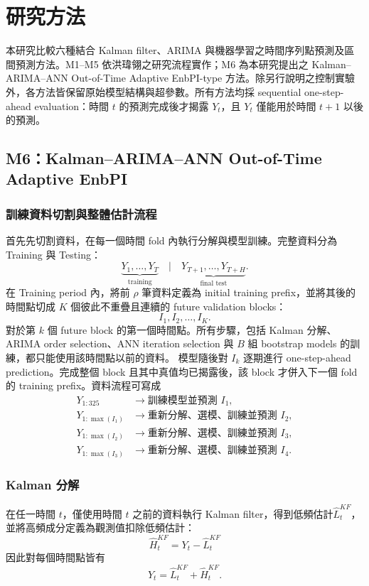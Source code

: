 \section{研究方法}
\label{sec:methodology}

本研究比較六種結合 Kalman filter、ARIMA 與機器學習之時間序列點預測及區間預測方法。M1--M5 依洪瑋翎之研究流程實作；M6 為本研究提出之 Kalman--ARIMA--ANN Out-of-Time Adaptive EnbPI-type 方法。除另行說明之控制實驗外，各方法皆保留原始模型結構與超參數。所有方法均採 sequential one-step-ahead evaluation：時間 $t$ 的預測完成後才揭露 $Y_t$，且 $Y_t$ 僅能用於時間 $t+1$ 以後的預測。

\subsection{M6：Kalman--ARIMA--ANN Out-of-Time Adaptive EnbPI}
\label{subsec:m6-method}

\subsubsection{訓練資料切割與整體估計流程}

首先先切割資料，在每一個時間 fold 內執行分解與模型訓練。完整資料分為 Training 與 Testing：
\[
    \underbrace{Y_1,\ldots,Y_T}_{\text{training}}
    \quad\Big|\quad
    \underbrace{Y_{T+1},\ldots,Y_{T+H}}_{\text{final test}}.
\]
在 Training period 內，將前 $\rho$ 筆資料定義為 initial training prefix，並將其後的時間點切成 $K$ 個彼此不重疊且連續的 future validation blocks：
\[
    I_1,I_2,\ldots,I_K.
\]
對於第 $k$ 個 future block 的第一個時間點。所有步驟，包括 Kalman 分解、ARIMA order selection、ANN iteration selection 與 $B$ 組 bootstrap models 的訓練，都只能使用該時間點以前的資料。
模型隨後對 $I_k$ 逐期進行 one-step-ahead prediction。完成整個 block 且其中真值均已揭露後，該 block 才併入下一個 fold 的 training prefix。資料流程可寫成
\[
\begin{aligned}
Y_{1:325}
&\longrightarrow \text{訓練模型並預測 }I_1,\\
Y_{1:\max(I_1)}
&\longrightarrow \text{重新分解、選模、訓練並預測 }I_2,\\
Y_{1:\max(I_2)}
&\longrightarrow \text{重新分解、選模、訓練並預測 }I_3,\\
Y_{1:\max(I_3)}
&\longrightarrow \text{重新分解、選模、訓練並預測 }I_4.
\end{aligned}
\]

\subsubsection{Kalman 分解}
在任一時間 $t$，僅使用時間 $t$ 之前的資料執行 Kalman filter，得到低頻估計$\widehat L_t^{KF}$，
並將高頻成分定義為觀測值扣除低頻估計：
\[\widehat H_t^{KF}=Y_t-\widehat L_t^{KF}\]
因此對每個時間點皆有
\[
    Y_t=\widehat L_t^{KF}+\widehat H_t^{KF}.
\]

